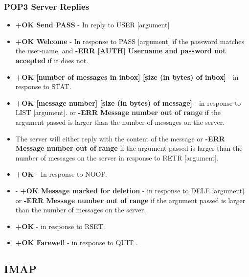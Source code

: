 \documentclass[11pt]{article}
\begin{document}
\begin{multicols}{2}
\subsubsection{POP3 Server Replies}
\begin{itemize}
  \item \textbf{+OK Send PASS} - In reply to USER [argument]
  \item \textbf{+OK Welcome} - In response to PASS [argument] if the password matches the user-name, and \textbf{-ERR [AUTH] Username and password not accepted} if it does not.
  \item \textbf{+OK [number of messages in inbox] [size (in bytes) of inbox]} - in response to STAT.
  \item  \textbf{+OK [message number] [size (in bytes) of message]} - in response to LIST [argument]. or \textbf{-ERR Message number out of range} if the argument passed is larger than the number of messages on the server.
  \item The server will either reply with the content of the message or \textbf{-ERR Message number out of range} if the argument passed is larger than the number of messages on the server in response to RETR [argument].
  \item \textbf{+OK} - In response to NOOP.
  \item - \textbf{+OK Message marked for deletion} - in response to DELE [argument]  or \textbf{-ERR Message number out of range} if the argument passed is larger than the number of messages on the server.
  \item \textbf{+OK} - in response to RSET.
  \item  \textbf{+OK Farewell} - in response to QUIT \cite{POP3}.
\end{itemize}

\subsection{IMAP}

\end{multicols}
\end{document}
